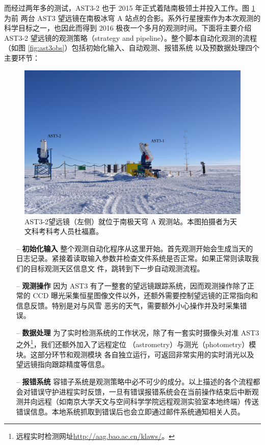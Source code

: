 而经过两年多的测试，AST3-2 也于 2015 年正式着陆南极领土并投入工作。图 \ref{fig:ast3tele} 为前
两台 AST3 望远镜在南极冰穹 A 站点的合影。系外行星搜索作为本次观测的科学目标之一，也因此而得到 
2016 极夜一个多月的观测时间。下面将主要介绍 AST3-2 望远镜的观测策略（strategy and 
pipeline）。整个脚本自动化观测的流程（如图 \ref{fig:ast3obs}）包括初始化输入、自动观测、报错系统
以及预数据处理四个主要环节：


\begin{figure}[t]
\centering
\includegraphics[width=1.0\textwidth]{figures/chapter2/f11_ast3.jpg}
\caption{AST3-2望远镜（左侧）就位于南极天穹 A 观测站。本图拍摄者为天文科考科考人员杜福嘉。}
\label{fig:ast3tele}
\end{figure}

\begin{enumerate}[leftmargin=1\parindent] 

\item[--] \textbf{初始化输入} {} 整个观测自动化程序从这里开始。首先观测开始会生成当天的
日志记录。紧接着读取输入参数并检查文件系统是否正常。如果正常则读取我们的目标观测天区信息文
件，跳转到下一步自动观测流程。


\item[--] \textbf{观测操作} {} 因为 AST3 有了一整套的望远镜跟踪系统，因而观测操作除了正
常的 CCD 曝光采集恒星图像文件以外，还额外需要控制望远镜的正常指向和信息反馈。特别是对与风雪
恶劣的天气，需要额外小心操作并及时采集错误。


\item[--] \textbf{数据处理} {} 为了实时检测系统的工作状况，除了有一套实时摄像头对准 
AST3之外\footnote{远程实时检测网址\url{http://aag.bao.ac.cn/klaws/}。}，我们还额外加入了远程定位
（astrometry）与测光（photometry）模块。这部分环节和观测模块
各自独立运行，可返回非常实用的实时消光以及望远镜指向跟踪精度等信息。


\item[--] \textbf{报错系统} {} 容错子系统是观测策略中必不可少的成分。以上描述的各个流程都会对错误守护进程实时反馈，一旦有错误报错系统会在当前操作结束后中断观测并向远程（如南京大学天文与空间科学学院远程观测实验室本地终端）传送错误信息。本地系统抓取到错误后也会立即通过邮件系统通知相关人员。

\end{enumerate}

